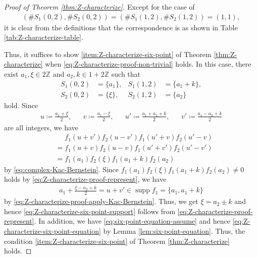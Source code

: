 \documentclass[12pt]{article}
\theoremstyle{definition}
\theoremstyle{remark}
\numberwithin{equation}{section}
\numberwithin{figure}{section}
\numberwithin{table}{section}
\DeclareMathOperator{\supp}{supp}
\begin{document}
\begin{proof}[Proof of Theorem \ref{thm:Z-characterize}]
Except for the case of
\begin{align}
    ( \# S_1 ( 0 , 2 ) , \# S_2 ( 0 , 2 ) ) = ( \# S_1 ( 1 , 2 ) , \# S_2 ( 1 , 2 ) ) = ( 1 , 1 ), \label{eq:Z-characterize-proof-non-trivial}
\end{align}
it is clear from the definitions that the correspondence is as shown
in Table \ref{tab:Z-characterize-table}.

Thus, it suffices to show \ref{item:Z-characterize-six-point} of Theorem \ref{thm:Z-characterize} when \eqref{eq:Z-characterize-proof-non-trivial} holds.
In this case, there exist $ a_1, \xi \in 2 \mathbb{ Z } $ and $ a_2 , k \in 1 + 2 \mathbb{ Z } $ such that
\begin{align}
    S_1 ( 0 , 2 ) & = \{ a_1 \}, &
    S_1 ( 1 , 2 ) & = \{ a_1 + k \}, \\
    S_2 ( 0 , 2 ) & = \{ \xi \}, &
    S_2 ( 1 , 2 ) & = \{ a_2 \} \label{eq:Z-characterize-proof-represent}
\end{align}
hold.
Since
\begin{align}
    u \coloneqq \frac{ a_1 + \xi }{ 2 }, & &
    v \coloneqq \frac{ a_1 - \xi }{ 2 }, & &
    u' \coloneqq \frac{ a_1 + a_2 + k }{ 2 }, & &
    v' \coloneqq \frac{ a_1 - a_2 + k }{ 2 }
\end{align}
are all integers, we have
\begin{align}
  & \phantom{ { } = { } } f_1 ( u + v' ) f_2 ( u - v' ) f_1 ( u' + v ) f_2 ( u' - v ) \\
  & = f_1 ( u + v ) f_2 ( u - v ) f_1 ( u' + v' ) f_2 ( u' - v' ) \\
  & = f_1 ( a_1 ) f_2 ( \xi ) f_1 ( a_1 + k ) f_2 ( a_2 ) \label{eq:Z-characterize-proof-apply-Kac-Bernstein}
\end{align}
by \eqref{eq:complex-Kac-Bernstein}.
Since $ f_1 ( a_1 ) f_2 ( \xi ) f_1 ( a_1 + k ) f_2 ( a_2 ) \neq 0 $ holds by \eqref{eq:Z-characterize-proof-represent}, we have
\begin{align}
    a_1 + \frac{ \xi - a_2 + k }{ 2 } = u + v' \in \supp f_1 = \{ a_1 , a_1 + k \}
\end{align}
by \eqref{eq:Z-characterize-proof-apply-Kac-Bernstein}.
Thus, we get $ \xi = a_2 \pm k $ and hence \eqref{eq:Z-characterize-six-point-support} follows from \eqref{eq:Z-characterize-proof-represent}.
In addition, we have \eqref{eq:six-point-equation-assume} and hence \eqref{eq:Z-characterize-six-point-equation} by Lemma \ref{lem:six-point-equation}.
Thus, the condition \ref{item:Z-characterize-six-point} of Theorem \ref{thm:Z-characterize} holds.
\end{proof}
\end{document}
